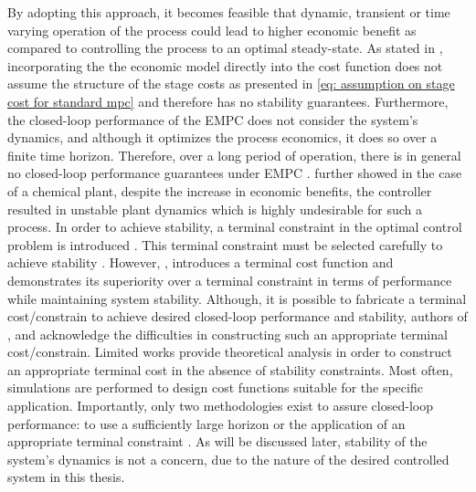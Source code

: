 By adopting this approach, it becomes feasible that dynamic, transient or time varying operation of the process could lead to higher economic benefit as compared to controlling the process to an optimal steady-state. As stated in \cite{rawlingsFundamentalsEconomicModel2012}, incorporating the the economic model directly into the cost function does not assume the structure of the stage costs as presented in \autoref{eq: assumption on stage cost for standard mpc} and therefore has no stability guarantees. 
Furthermore, the closed-loop performance of the EMPC does not consider the system's dynamics, and although it optimizes the process economics, it does so over a finite time horizon. Therefore, over a long period of operation, there is in general no closed-loop performance guarantees under EMPC \cite{ellisTutorialReviewEconomic2014}.
\cite{rawlingsFundamentalsEconomicModel2012} further showed  in the case of a chemical plant, despite the increase in economic benefits, the controller resulted in unstable plant dynamics which is highly undesirable for such a process. In order to achieve stability, a terminal constraint in the optimal control problem is introduced \cite{amritEconomicOptimizationUsing2011}. This terminal constraint must be selected carefully to achieve stability \cite{rawlingsFundamentalsEconomicModel2012}. However, \cite{amritEconomicOptimizationUsing2011}, introduces a terminal cost function and demonstrates its superiority over a terminal constraint in terms of performance while maintaining system stability. Although, it is possible to fabricate a terminal cost/constrain to achieve desired closed-loop performance and stability, authors of \cite{rawlingsFundamentalsEconomicModel2012}, \cite{amritEconomicOptimizationUsing2011} and \cite{ellisTutorialReviewEconomic2014} acknowledge the difficulties in constructing such an appropriate terminal cost/constrain. Limited works provide theoretical analysis in order to construct an appropriate terminal cost in the absence of stability constraints. Most often, simulations are performed to design cost functions suitable for the specific application. Importantly, only two methodologies exist to assure closed-loop performance: to use a sufficiently large horizon or the application of an appropriate terminal constraint \cite{ellisTutorialReviewEconomic2014}. As will be discussed later, stability of the system's dynamics is not a concern, due to the nature of the desired controlled system in this thesis.


